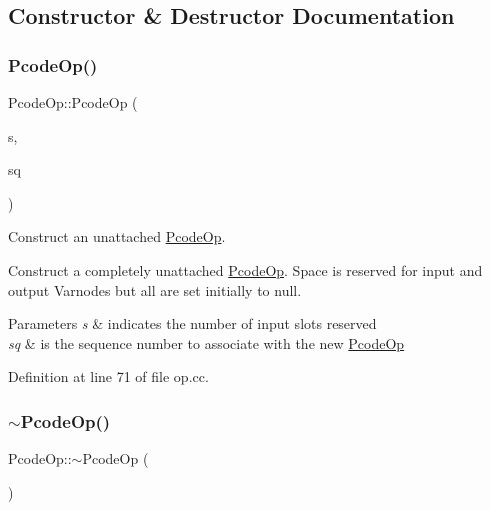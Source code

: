 \subsection{Constructor \& Destructor Documentation}
\mbox{\label{class_pcode_op_af0d30dfcb1e58033fd3b25cebfcfffa5}} 
\subsubsection{\texorpdfstring{PcodeOp()}{PcodeOp()}}
{\footnotesize\ttfamily Pcode\+Op\+::\+Pcode\+Op (\begin{DoxyParamCaption}\item[{int4}]{s,  }\item[{const \mbox{\hyperlink{class_seq_num}{Seq\+Num}} \&}]{sq }\end{DoxyParamCaption})}



Construct an unattached \mbox{\hyperlink{class_pcode_op}{Pcode\+Op}}. 

Construct a completely unattached \mbox{\hyperlink{class_pcode_op}{Pcode\+Op}}. Space is reserved for input and output Varnodes but all are set initially to null. 
\begin{DoxyParams}{Parameters}
{\em s} & indicates the number of input slots reserved \\
\hline
{\em sq} & is the sequence number to associate with the new \mbox{\hyperlink{class_pcode_op}{Pcode\+Op}} \\
\hline
\end{DoxyParams}


Definition at line 71 of file op.\+cc.

\mbox{\label{class_pcode_op_a9c4e5b2b819c19196421903f27e7fbe8}} 
\subsubsection{\texorpdfstring{$\sim$PcodeOp()}{~PcodeOp()}}
{\footnotesize\ttfamily Pcode\+Op\+::$\sim$\+Pcode\+Op (\begin{DoxyParamCaption}\item[{void}]{ }\end{DoxyParamCaption})\hspace{0.3cm}{\ttfamily [inline]}}



